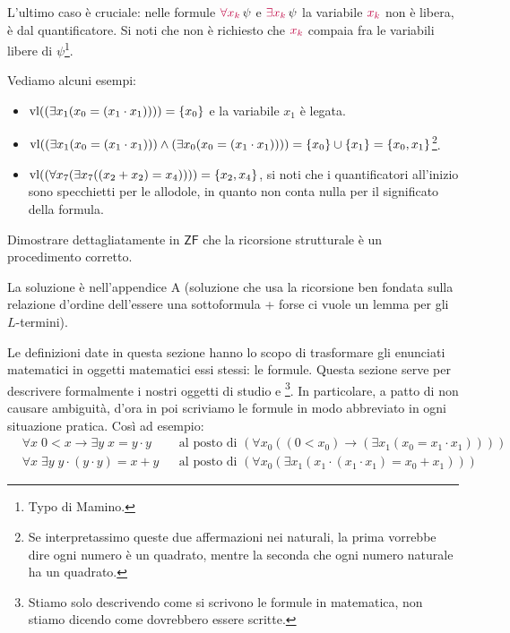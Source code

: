\begin{remark}
    L'ultimo caso è cruciale: nelle formule $\textcolor{purple}{\forall x_k} \, \psi$ e $\textcolor{purple}{\exists x_k} \, \psi$ la variabile $\textcolor{purple}{x_k}$ non è libera, è  dal quantificatore.
    Si noti che non è richiesto che $\textcolor{purple}{x_k}$ compaia fra le variabili libere di $\psi$\footnote{Typo di Mamino.}.
\end{remark}

\begin{example}
    Vediamo alcuni esempi:
    \begin{itemize}[$\diamondsuit$]
        \item $\operatorname{vl}((\exists x_1 ( x_0 = (x_1 \cdot x_1)))) = \{x_0\}$ e la variabile $x_1$ è legata.
        \item $\operatorname{vl}((\exists x_1 ( x_0 = (x_1 \cdot x_1))) \land (\exists x_0 ( x_0 = (x_1 \cdot x_1)))) = \{x_0\} \cup \{x_1\} = \{x_0,x_1\}$\footnote{Se interpretassimo queste due affermazioni nei naturali, la prima vorrebbe dire ogni numero è un quadrato, mentre la seconda che ogni numero naturale ha un quadrato.}.
        \item $\operatorname{vl}((\forall x_7 (\exists x_7 ((x_2 + x_2) = x_4)))) = \{x_2,x_4\}$, si noti che i quantificatori all'inizio sono specchietti per le allodole, in quanto non conta nulla per il significato della formula.
    \end{itemize}
\end{example}

\begin{exercise}
    Dimostrare dettagliatamente in $\mathsf{ZF}$ che la ricorsione strutturale è un procedimento corretto.
\end{exercise}

La soluzione è nell'appendice A (soluzione che usa la ricorsione ben fondata sulla relazione d'ordine dell'essere una sottoformula + forse ci vuole un lemma per gli $L$-termini).

\begin{note}
    Le definizioni date in questa sezione hanno lo scopo di trasformare gli enunciati matematici in oggetti matematici essi stessi: le formule.
    Questa sezione serve per descrivere formalmente i nostri oggetti di studio e \footnote{Stiamo solo descrivendo come si scrivono le formule in matematica, non stiamo dicendo come dovrebbero essere scritte.}.
    In particolare, a patto di non causare ambiguità, d'ora in poi scriviamo le formule in modo abbreviato in ogni situazione pratica. Così ad esempio:
    \begin{align*}
        &\forall x\; 0 < x \to \exists y \; x = y \cdot y &&\text{al posto di $(\forall x_0((0 < x_0) \to (\exists x_1 (x_0 = x_1 \cdot x_1))))$}\\
        &\forall x\; \exists y \; y \cdot (y \cdot y) = x + y &&\text{al posto di  $(\forall x_0(\exists x_1 ( x_1 \cdot (x_1 \cdot x_1) = x_0 + x_1)))$} 
    \end{align*}
\end{note}

